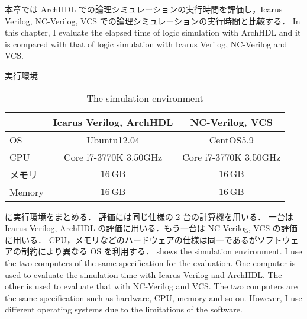 本章では ArchHDL での論理シミュレーションの実行時間を評価し，Icarus Verilog, NC-Verilog, VCS での論理シミュレーションの実行時間と比較する．
\fi
In this chapter, I evaluate the elapsed time of logic simulation with ArchHDL and it is compared with that of logic simulation with Icarus Verilog, NC-Verilog and VCS.

\begin{table}[t]
 \caption{実行環境}
\fi
 \caption{The simulation environment}
 \label{table:exec_env}
 \begin{center}
  \begin{tabular}{l|c|c} \hline
         &  Icarus Verilog, ArchHDL  &  NC-Verilog, VCS   \\ \hline
  OS     &  Ubuntu12.04             &  CentOS5.9        \\
  CPU    &  Core i7-3770K 3.50GHz   &  Core i7-3770K 3.50GHz  \\
\if0
  メモリ  &  $16\,\mathrm{GB}$       &  $16\,\mathrm{GB}$  \\ \hline
\fi
   Memory &  $16\,\mathrm{GB}$       &  $16\,\mathrm{GB}$  \\ \hline
  \end{tabular}
 \end{center}
\end{table}

 に実行環境をまとめる．
評価には同じ仕様の 2 台の計算機を用いる．
一台は Icarus Verilog, ArchHDL の評価に用いる．もう一台は NC-Verilog, VCS の評価に用いる．
CPU，メモリなどのハードウェアの仕様は同一であるがソフトウェアの制約により異なる OS を利用する．
\fi
{} shows the simulation environment.
I use the two computers of the same specification for the evaluation.
One computer is used to evaluate the simulation time with Icarus Verilog and ArchHDL.
The other is used to evaluate that with NC-Verilog and VCS.
The two computers are the same specification such as hardware, CPU, memory and so on.
However, I use different operating systems due to the limitations of the software.

